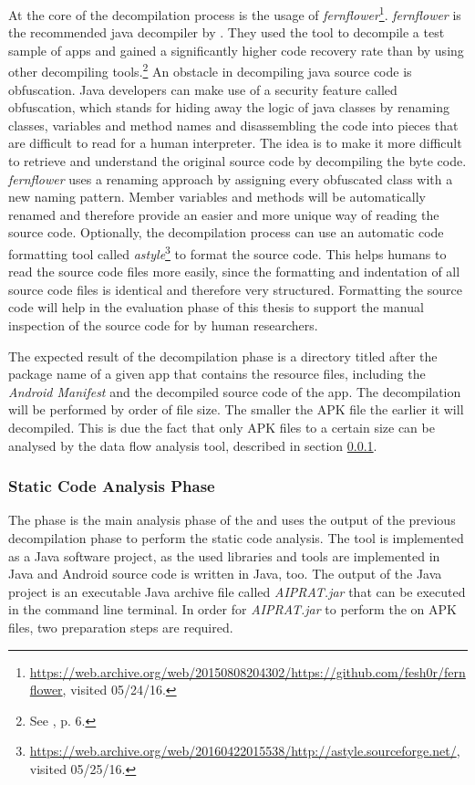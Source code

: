 At the core of the decompilation process is the usage of \textit{fernflower}\footnote{\url{https://web.archive.org/web/20150808204302/https://github.com/fesh0r/fernflower}, visited 05/24/16.}.
\textit{fernflower} is the recommended java decompiler by \cite{Enck2011}. 
They used the tool to decompile a test sample of apps and gained a significantly higher code recovery rate than by using other decompiling tools.\footnote{See \cite{Enck2011}, p. 6.}
An obstacle in decompiling java source code is obfuscation. 
Java developers can make use of a security feature called obfuscation, which stands for hiding away the logic of java classes by renaming classes, variables and method names and disassembling the code into pieces that are difficult to read for a human interpreter.
The idea is to make it more difficult to retrieve and understand the original source code by decompiling the byte code.
\textit{fernflower} uses a renaming approach by assigning every obfuscated class with a new naming pattern. 
Member variables and methods will be automatically renamed and therefore provide an easier and more unique way of reading the source code.
Optionally, the decompilation process can use an automatic code formatting tool called \textit{astyle}\footnote{\url{https://web.archive.org/web/20160422015538/http://astyle.sourceforge.net/}, visited 05/25/16.} to format the source code.
This helps humans to read the source code files more easily, since the formatting and indentation of all source code files is identical and therefore very structured.
Formatting the source code will help in the evaluation phase of this thesis to support the manual inspection of the source code for \ipr by human researchers.

The expected result of the decompilation phase is a directory titled after the package name of a given app that contains the resource files, including the \textit{Android Manifest} and the decompiled source code of the app.
The decompilation will be performed by order of file size.
The smaller the APK file the earlier it will decompiled.
This is due the fact that only APK files to a certain size can be analysed by the data flow analysis tool, described in section \ref{sssec:SCAP}.

\subsubsection{Static Code Analysis Phase} \label{sssec:SCAP}

The \sca phase is the main analysis phase of the \aiprat and uses the output of the previous decompilation phase to perform the static code analysis.
The \sca tool is implemented as a Java software project, as the used libraries  and tools are implemented in Java and Android source code is written in Java, too.
The output of the \sca Java project is an executable Java archive file called \textit{AIPRAT.jar} that can be executed in the command line terminal.
In order for \textit{AIPRAT.jar} to perform the \sca on APK files, two preparation steps are required.

